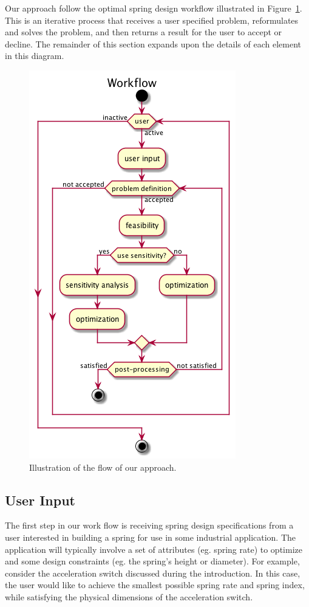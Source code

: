 \documentclass[10pt]{article}
\begin{document}
Our approach follow the optimal spring design workflow illustrated in Figure~\ref{Workflow}. This is an iterative process that receives a user specified problem, reformulates and solves the problem, and then returns a result for the user to accept or decline. The remainder of this section expands upon the details of each element in this diagram.

		\begin{figure}[h!]
		 \begin{center}\includegraphics[scale=.4]{IMSM_Workflow.png}\end{center}
		 \caption{Illustration of the flow of our approach.}
		 \label{Workflow}
		 
		 \end{figure}

\subsection{User Input}
\label{subsec:User_Input}

The first step in our work flow is receiving spring design specifications from a user interested in building a spring for use in some industrial application.  The application will typically involve a set of attributes (eg. spring rate) to optimize and some design constraints (eg. the spring's height or diameter).  For example, consider the acceleration switch discussed during the introduction.  In this case, the user would like to achieve the smallest possible spring rate and spring index, while satisfying the physical dimensions of the acceleration switch.
\end{document}
